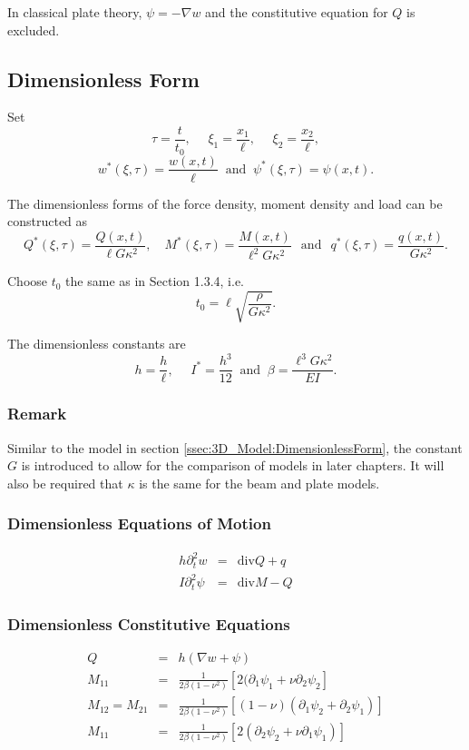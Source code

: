\documentclass[../../main.tex]{subfiles}
\begin{document}
	In classical plate theory, $\psi = -\nabla w$ and the constitutive equation for $Q$ is excluded.
	
	\subsection{Dimensionless Form}\label{ssec:P_Model:DimensionlessForm}
	
	Set
	\[\tau = \frac{t}{t_0}, \,\, \quad \xi_1 = \frac{x_1}{\ell}, \,\, \quad \xi_2 = \frac{x_2}{\ell},\] 
	\[w^*(\xi,\tau) = \frac{w(x,t)}{\ell} \ \text{ and } \ {\psi}^*(\xi, \tau) = {\psi}(x,t).\]
	
	The dimensionless forms of the force density, moment density and load can be constructed as \[ Q^{*}(\xi,\tau) = \frac{Q(x,t)}{\ell G\kappa^2}, \quad M^{*}(\xi,\tau) = \frac{M(x,t)}{\ell^2 G\kappa^2} \,\,\, \ \text{and} \ \,\,\, q^*(\xi,\tau) = \frac{q(x,t)}{G\kappa^2}.\]
	
	Choose $t_0$ the same as in Section 1.3.4, i.e. \[t_0 = \ell\sqrt{\frac{\rho}{G\kappa^2}}.\]
	
	The dimensionless constants are
	\[h = \frac{h}{\ell}, \,\, \quad I^* = \frac{h^3}{12} \ \text{ and } \  \beta = \frac{\ell^3G\kappa^2}{EI}.\]
	
	\subsubsection{Remark}
	Similar to the model in section \ref{ssec:3D_Model:DimensionlessForm}, the constant $G$ is introduced to allow for the comparison of models in later chapters. It will also be required that $\kappa$ is the same for the beam and plate models.
	
	\subsubsection{Dimensionless Equations of Motion}\label{sssec:P_Model:EquationsOfMotionD}
	\begin{eqnarray}
		h \partial_t^2 w & = & \textrm{div} Q + q \label{eq:P_Model:EM1D} \\
		I \partial_t^2 {\psi} & = & \textrm{div} M - Q \label{eq:P_Model:EM2D_chap1}
	\end{eqnarray}
	\subsubsection{Dimensionless Constitutive Equations}\label{sssec:P_Model:ConstitutiveEquationsD}
	\begin{eqnarray}
		Q & = & h(\nabla w + \psi) \label{eq:P_Model:CE1D}\\
		M_{11} & = & \frac{1}{2\beta(1-\nu^2)} \left[ 2(\partial_1\psi_1 + \nu \partial_2 \psi_2 \right] \label{eq:P_Model:CE2D}\\
		M_{12} = M_{21} & = & \frac{1}{2\beta(1-\nu^2)} \left[ (1-\nu)(\partial_1\psi_2 + \partial_2 \psi_1) \right] \label{eq:P_Model:CE3D}\\
		M_{11} & = & \frac{1}{2\beta(1-\nu^2)} \left[ 2(\partial_2 \psi_2 + \nu \partial_1 \psi_1)\right] \label{eq:P_Model:CE4D_chap1}
	\end{eqnarray}
\end{document}

